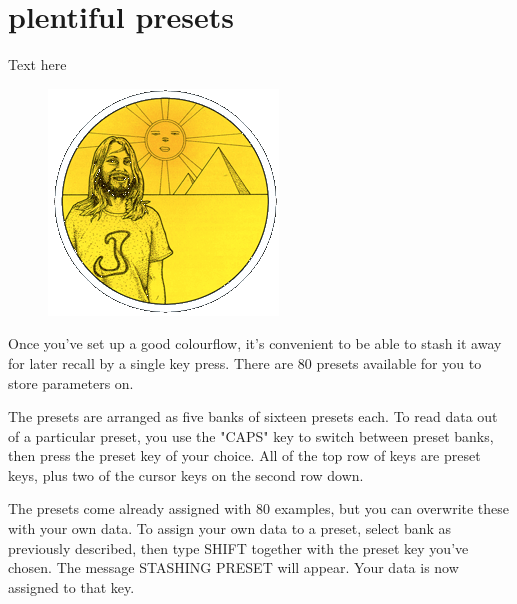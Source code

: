 \chapter{plentiful presets} 
\label{sec:presets}
\lstset{style=6502Style}
Text here
\begin{definition}
\setlength{\intextsep}{0pt}%
\setlength{\columnsep}{3pt}%
\begin{figure}
\includegraphics[width=\linewidth]{src/callout/psych.png} 
\end{figure}
\small
Once you've set up a good colourflow, it's convenient to be able to stash it
away for later recall by a single key press.  There are 80 presets available
for you to store parameters on.

The presets are arranged as five banks of sixteen presets each.  To read data
out of a particular preset, you use the "CAPS" key to switch between preset
banks, then press the preset key of your choice.  All of the top row of keys
are preset keys, plus two of the cursor keys on the second row down.

The presets come already assigned with 80 examples, but you can overwrite these
with your own data.  To assign your own data to a preset, select bank as
previously described, then type SHIFT together with the preset key you've
chosen.  The message STASHING PRESET will appear.  Your data is now assigned
to that key.  
\end{definition}

